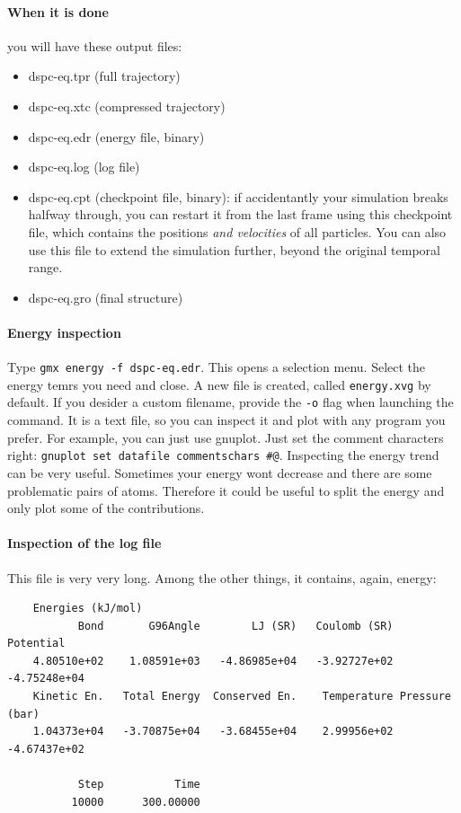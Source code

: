 \paragraph{When it is done}you will have these output files:
\begin{itemize}
  \item dspc-eq.tpr (full trajectory)
  \item dspc-eq.xtc (compressed trajectory)
  \item dspc-eq.edr (energy file, binary)
  \item dspc-eq.log (log file)
  \item dspc-eq.cpt (checkpoint file, binary): if accidentantly your simulation breaks halfway through, you can restart it from the last frame using this checkpoint file, which contains the positions \textit{and velocities} 
  of all particles. You can also use this file to extend the simulation further, beyond the original temporal range. 
  \item dspc-eq.gro (final structure)
\end{itemize}


\paragraph{Energy inspection}
Type \texttt{gmx energy -f dspc-eq.edr}. This opens a selection menu. Select the energy temrs you need and close. A new file is created, called
\texttt{energy.xvg} by default. If you desider a custom filename, provide the \texttt{-o} flag when launching the command. It is a text file, so you can inspect it and plot with any program you prefer. For example, you can just use
gnuplot. Just set the comment characters right: \texttt{gnuplot set datafile commentschars \texttt{\#@}}. Inspecting the energy trend can be very useful.
Sometimes your energy wont decrease and there are some problematic pairs of atoms. Therefore it could be useful to split the energy and only plot some of the contributions. 



\paragraph{Inspection of the log file}
This file is very very long. Among the other things, it contains, again, energy:


{
  \small
\begin{verbatim}
    Energies (kJ/mol)
           Bond       G96Angle        LJ (SR)   Coulomb (SR)      Potential
    4.80510e+02    1.08591e+03   -4.86985e+04   -3.92727e+02   -4.75248e+04
    Kinetic En.   Total Energy  Conserved En.    Temperature Pressure (bar)
    1.04373e+04   -3.70875e+04   -3.68455e+04    2.99956e+02   -4.67437e+02

           Step           Time
          10000      300.00000
\end{verbatim}
}

